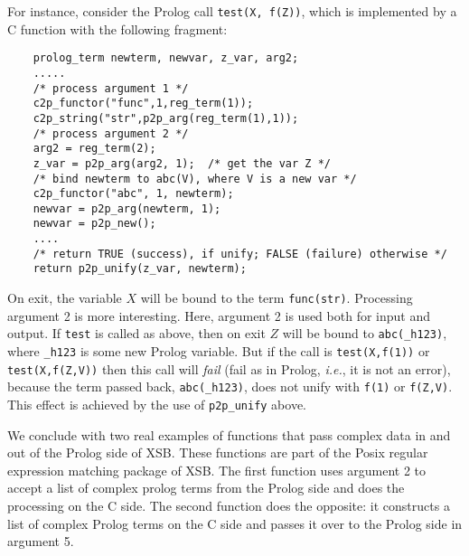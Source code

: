 For instance, consider the Prolog call {\tt test(X, f(Z))},
which is implemented by a C function with the following fragment:
\begin{verbatim}
    prolog_term newterm, newvar, z_var, arg2;
    .....
    /* process argument 1 */
    c2p_functor("func",1,reg_term(1));
    c2p_string("str",p2p_arg(reg_term(1),1));
    /* process argument 2 */
    arg2 = reg_term(2);
    z_var = p2p_arg(arg2, 1);  /* get the var Z */
    /* bind newterm to abc(V), where V is a new var */
    c2p_functor("abc", 1, newterm);
    newvar = p2p_arg(newterm, 1);
    newvar = p2p_new();
    ....
    /* return TRUE (success), if unify; FALSE (failure) otherwise */
    return p2p_unify(z_var, newterm);
\end{verbatim}
On exit, the variable $X$ will be bound to the term {\tt func(str)}.
Processing argument 2 is more interesting. Here, argument 2 is used both
for input and output. If {\tt test} is called as above, then on exit $Z$
will be bound to {\tt abc(\_h123)}, where {\tt \_h123} is some new Prolog
variable. But if the call is {\tt test(X,f(1))} or {\tt test(X,f(Z,V))}
then this call will \emph{fail} (fail as in Prolog, {\it i.e.}, it is not
an error), because the term passed back, {\tt abc(\_h123)}, does not unify
with {\tt f(1)} or {\tt f(Z,V)}. This effect is achieved by the use of
{\tt p2p\_unify} above.

We conclude with two real examples of functions that pass complex data in
and out of the Prolog side of XSB. These functions are part of the Posix
regular expression matching package of XSB. The first function uses
argument 2 to accept a
list of complex prolog terms from the Prolog side and does the processing
on the C side. The second function does the opposite: it constructs
a list of complex Prolog terms on the C side and passes it over to the
Prolog side in argument 5.

